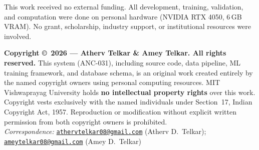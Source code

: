 \documentclass[10pt,twocolumn]{article}
\begin{document}
This work received no external funding. All development,
training, validation, and computation were done on personal
hardware (NVIDIA RTX 4050, 6\,GB VRAM). No grant, scholarship,
industry support, or institutional resources were involved.
 
\vspace{6pt}
\begin{tcolorbox}[cpybox]
\footnotesize
\textbf{Copyright \copyright\ 2026 --- Atherv Telkar \&
Amey Telkar. All rights reserved.}
This system (ANC-031), including source code, data
pipeline, ML training framework, and database schema, is an
original work created entirely by the named copyright owners
using personal computing resources. MIT Vishwaprayag University
holds \textbf{no intellectual property rights} over this work.
Copyright vests exclusively with the named individuals under
Section~17, Indian Copyright Act, 1957. Reproduction or
modification without explicit written permission from both
copyright owners is prohibited.\\[3pt]
\textit{Correspondence:}
\href{mailto:athervtelkar08@gmail.com}
{\texttt{athervtelkar08@gmail.com}}
(Atherv D.\ Telkar);\enspace
\href{mailto:ameytelkar08@gmail.com}
{\texttt{ameytelkar08@gmail.com}}
(Amey D.\ Telkar)
\end{tcolorbox}
 
\end{document}
